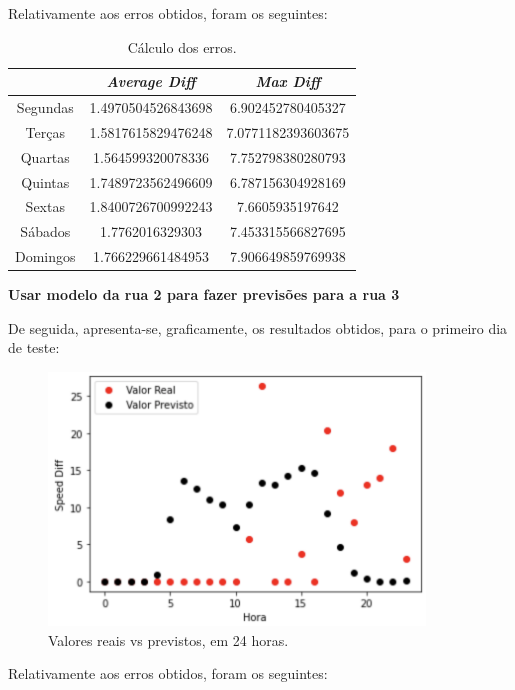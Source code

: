 \documentclass[a4paper, 12pt]{article}
\begin{document}
Relativamente aos erros obtidos, foram os seguintes:

\begin{table}[H]
	\centering
	\begin{tabular}{||c||c|c||}
		\hline\hline
		& \textit{Average Diff} & \textit{Max Diff} \\
		\hline\hline
		Segundas & 1.4970504526843698
 & 6.902452780405327 \\
		\hline
		Terças  &
1.5817615829476248
 & 7.0771182393603675 \\
		\hline
		Quartas & 
1.564599320078336 & 7.752798380280793	\\
		\hline
		Quintas  & 1.7489723562496609
 & 6.787156304928169	\\
		\hline
		Sextas & 
1.8400726700992243 & 7.6605935197642 \\
		\hline
		Sábados  & 1.7762016329303
 & 7.453315566827695 \\
		\hline
		Domingos & 
1.766229661484953 & 
7.906649859769938
\\
		\hline\hline
	\end{tabular}
	\label{table:mod2_rua1}
	\caption{Cálculo dos erros.}
\end{table}


\vspace{0.5cm}
\textbf{Usar modelo da rua 2 para fazer previsões para a rua 3}

De seguida, apresenta-se, graficamente, os resultados obtidos, para o primeiro dia de teste:

\begin{figure}[H]
	\centering
	\includegraphics[width=10cm]{resultados/real_prev_mod2_rua3.png}
	\caption{Valores reais vs previstos, em 24 horas.}
\end{figure}

Relativamente aos erros obtidos, foram os seguintes:
\end{document}
